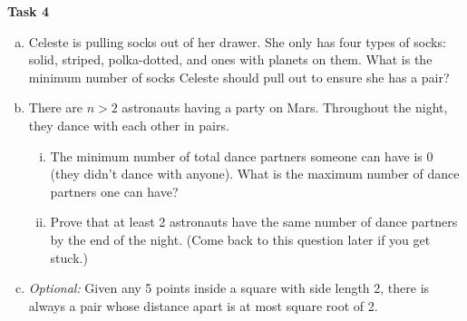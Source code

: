 \documentclass[12pt,letterpaper]{article}
\newenvironment{22enumerate}{\begin{enumerate}[a.]\itemsep0em}{\end{enumerate}}
\newif\ifsol
\newcommand{\solu}[2]{ \begin{mdframed} \ifsol #2 \else \vspace{#1} \fi \end{mdframed} }
\begin{document}
\textbf{Task 4}
\begin{22enumerate}
  \item Celeste is pulling socks out of her drawer. She only has four types of socks: solid, striped, polka-dotted, and ones with planets on them. What is the minimum number of socks Celeste should pull out to ensure she has a pair? 
  
  \solu{1 cm}{We are asking what the size of the domain of a function needs to be, where the function is from socks to types, such that there is some style with at least 2 socks that map to it. The answer is therefore 5.}
  
  \item  There are $n > 2$ astronauts having a party on Mars. Throughout the night, they dance with each other in pairs.

		\begin{enumerate}[i.]
			\item The minimum number of total dance partners someone can have is 0 (they didn't dance with anyone). What is the maximum number of dance partners one can have?
			
			\solu{2cm}{$n - 1$, dancing with everyone else}

			\item Prove that at least 2 astronauts have the same number of dance partners by the end of the night. (Come back to this question later if you get stuck.)
			
			\solu{2cm}{The possible number of dance partners are $[0, n - 1]$. Trying to apply the pigeonhole principle directly doesn't work, since it seems like all $n$ astronauts could have all $n$ possible numbers of partners. But, if someone has $0$ dance partners, then no one can have $n - 1$. So, the choices are either $[1, n-1]$ or $[0, n-2]$, each of which results in $n - 1$ possible options for the number of dance partners. Since we have $n$ astronauts, two people must have the same number of partners.}

		\end{enumerate}

 \item \textit{Optional:} Given any 5 points inside a square with side length 2, there is always a pair whose distance apart is at most square root of 2. 
 
 \solu{6 cm}{Partition the square into 4 unit squares. Then, there is a square with two dots. The maximum distance between two points within a unit square is square root of 2.}
\end{22enumerate}
\end{document}
